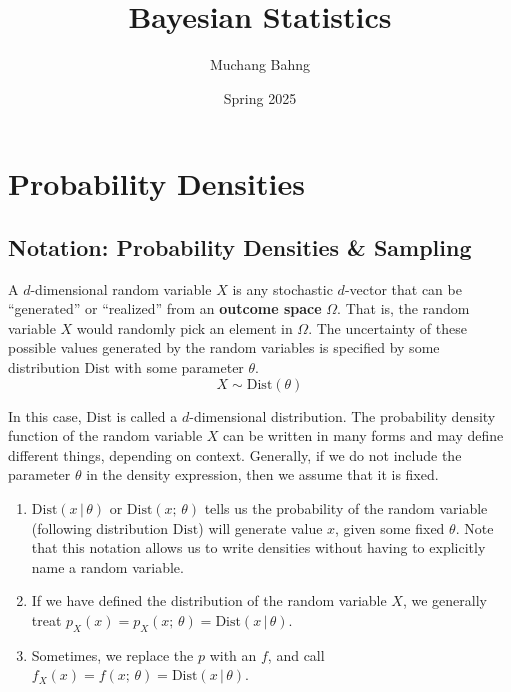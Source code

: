 \documentclass{article}
\begin{document}
\title{Bayesian Statistics}
\author{Muchang Bahng}
\date{Spring 2025}

\maketitle
\tableofcontents
\pagebreak

\section{Probability Densities}

  \subsection{Notation: Probability Densities \& Sampling}

    A $d$-dimensional random variable $X$ is any stochastic $d$-vector that can be ``generated'' or ``realized'' from an \textbf{outcome space} $\Omega$. That is, the random variable $X$ would randomly pick an element in $\Omega$. The uncertainty of these possible values generated by the random variables is specified by some distribution $\text{Dist}$ with some parameter $\theta$.
    \begin{equation}
      X \sim \text{Dist}(\theta)
    \end{equation}

    In this case, $\text{Dist}$ is called a $d$-dimensional distribution. The probability density function of the random variable $X$ can be written in many forms and may define different things, depending on context. Generally, if we do not include the parameter $\theta$ in the density expression, then we assume that it is fixed.

    \begin{enumerate}
      \item $\text{Dist}(x\,|\,\theta)$ or $\text{Dist}(x;\, \theta)$ tells us the probability of the random variable (following distribution $\text{Dist}$) will generate value $x$, given some fixed $\theta$. Note that this notation allows us to write densities without having to explicitly name a random variable.
      \item If we have defined the distribution of the random variable $X$, we generally treat $p_X (x) = p_X (x;\, \theta) = \text{Dist}(x\,|\,\theta)$.
      \item Sometimes, we replace the $p$ with an $f$, and call $f_X (x) = f(x;\,\theta) = \text{Dist}(x\,|\, \theta)$.
    \end{enumerate}
\end{document}
